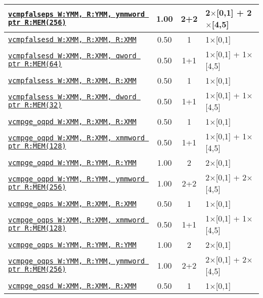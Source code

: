 \documentclass[a4paper,english,fontsize=9]{scrartcl}
\begin{document}
\begin{longtable}{p{}ccL{.25\textwidth}}
  \midrule
  \texttt{\href{https://felixcloutier.com/x86/CMPPS.html}{vcmpfalseps W:YMM, R:YMM, ymmword ptr R:MEM(256)}} & 1.00 & 2+2 & 2\(\times\)[0,1] + 2\(\times\)[4,5] \\
  \midrule
  \texttt{\href{https://felixcloutier.com/x86/CMPSD.html}{vcmpfalsesd W:XMM, R:XMM, R:XMM}} & 0.50 & 1 & 1\(\times\)[0,1] \\
  \midrule
  \texttt{\href{https://felixcloutier.com/x86/CMPSD.html}{vcmpfalsesd W:XMM, R:XMM, qword ptr R:MEM(64)}} & 0.50 & 1+1 & 1\(\times\)[0,1] + 1\(\times\)[4,5] \\
  \midrule
  \texttt{\href{https://felixcloutier.com/x86/CMPSS.html}{vcmpfalsess W:XMM, R:XMM, R:XMM}} & 0.50 & 1 & 1\(\times\)[0,1] \\
  \midrule
  \texttt{\href{https://felixcloutier.com/x86/CMPSS.html}{vcmpfalsess W:XMM, R:XMM, dword ptr R:MEM(32)}} & 0.50 & 1+1 & 1\(\times\)[0,1] + 1\(\times\)[4,5] \\
  \midrule
  \texttt{\href{https://felixcloutier.com/x86/CMPPD.html}{vcmpge\_oqpd W:XMM, R:XMM, R:XMM}} & 0.50 & 1 & 1\(\times\)[0,1] \\
  \midrule
  \texttt{\href{https://felixcloutier.com/x86/CMPPD.html}{vcmpge\_oqpd W:XMM, R:XMM, xmmword ptr R:MEM(128)}} & 0.50 & 1+1 & 1\(\times\)[0,1] + 1\(\times\)[4,5] \\
  \midrule
  \texttt{\href{https://felixcloutier.com/x86/CMPPD.html}{vcmpge\_oqpd W:YMM, R:YMM, R:YMM}} & 1.00 & 2 & 2\(\times\)[0,1] \\
  \midrule
  \texttt{\href{https://felixcloutier.com/x86/CMPPD.html}{vcmpge\_oqpd W:YMM, R:YMM, ymmword ptr R:MEM(256)}} & 1.00 & 2+2 & 2\(\times\)[0,1] + 2\(\times\)[4,5] \\
  \midrule
  \texttt{\href{https://felixcloutier.com/x86/CMPPS.html}{vcmpge\_oqps W:XMM, R:XMM, R:XMM}} & 0.50 & 1 & 1\(\times\)[0,1] \\
  \midrule
  \texttt{\href{https://felixcloutier.com/x86/CMPPS.html}{vcmpge\_oqps W:XMM, R:XMM, xmmword ptr R:MEM(128)}} & 0.50 & 1+1 & 1\(\times\)[0,1] + 1\(\times\)[4,5] \\
  \midrule
  \texttt{\href{https://felixcloutier.com/x86/CMPPS.html}{vcmpge\_oqps W:YMM, R:YMM, R:YMM}} & 1.00 & 2 & 2\(\times\)[0,1] \\
  \midrule
  \texttt{\href{https://felixcloutier.com/x86/CMPPS.html}{vcmpge\_oqps W:YMM, R:YMM, ymmword ptr R:MEM(256)}} & 1.00 & 2+2 & 2\(\times\)[0,1] + 2\(\times\)[4,5] \\
  \midrule
  \texttt{\href{https://felixcloutier.com/x86/CMPSD.html}{vcmpge\_oqsd W:XMM, R:XMM, R:XMM}} & 0.50 & 1 & 1\(\times\)[0,1] \\

\end{longtable}
\end{document}
